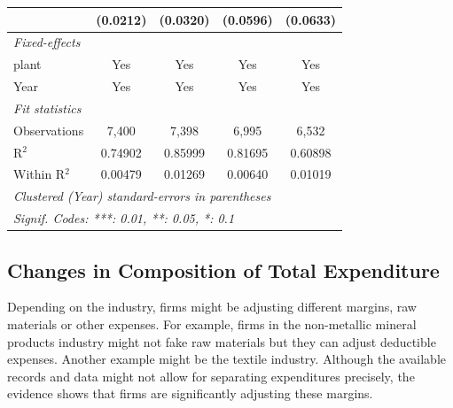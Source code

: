 \documentclass[
  12pt]{article}
\theoremstyle{definition}
\theoremstyle{remark}
\begin{document}
\begin{table}
\begin{minipage}{\linewidth}
\begin{tabular}{lcccc}
                                                           & (0.0212)           & (0.0320)             & (0.0596)            & (0.0633)\\   
   \midrule
   \emph{Fixed-effects}\\
   plant                                                   & Yes                & Yes                  & Yes                 & Yes\\  
   Year                                                    & Yes                & Yes                  & Yes                 & Yes\\  
   \midrule
   \emph{Fit statistics}\\
   Observations                                            & 7,400              & 7,398                & 6,995               & 6,532\\  
   R$^2$                                                   & 0.74902            & 0.85999              & 0.81695             & 0.60898\\  
   Within R$^2$                                            & 0.00479            & 0.01269              & 0.00640             & 0.01019\\  
   \midrule \midrule
   \multicolumn{5}{l}{\emph{Clustered (Year) standard-errors in parentheses}}\\
   \multicolumn{5}{l}{\emph{Signif. Codes: ***: 0.01, **: 0.05, *: 0.1}}\\
\end{tabular}
\par\endgroup

\end{minipage}%

\end{table}%

\subsection{Changes in Composition of Total
Expenditure}\label{changes-in-composition-of-total-expenditure}

Depending on the industry, firms might be adjusting different margins,
raw materials or other expenses. For example, firms in the non-metallic
mineral products industry might not fake raw materials but they can
adjust deductible expenses. Another example might be the textile
industry. Although the available records and data might not allow for
separating expenditures precisely, the evidence shows that firms are
significantly adjusting these margins.
\end{document}
